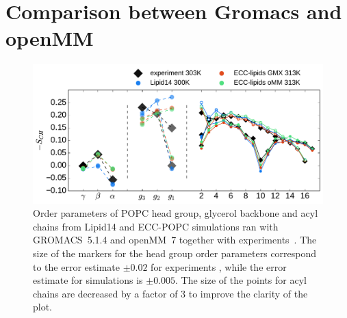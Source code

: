 \documentclass[journal=jpcbfk]{achemso}
\begin{document}
\newpage
\section{Comparison between Gromacs and openMM}

\begin{figure}[!h]
  \centering
  \includegraphics[width=16.0cm]{../Fig/ipython_nb/Order-parameters_exp-L14-ECCL17_q80_sig89_GMX-oMM_compar.pdf}
  \caption{\label{fig:ordPars_actual_GMX_oMM_compar}
    Order parameters of POPC head group, glycerol backbone and acyl chains 
    from Lipid14 \cite{dickson14} and ECC-POPC simulations ran
    with GROMACS~5.1.4 \cite{Abraham15} and openMM~7 \cite{openmm7} 
    together with experiments~\cite{ferreira13}.
    The size of the markers for the head group order parameters correspond to
    the error estimate $\pm 0.02$ for experiments \cite{botan15,ollila16},
    while the error estimate for simulations is $\pm 0.005$.
    The size of the points for acyl chains are decreased by a factor of 3 to improve the clarity of the plot.
  }
\end{figure}
\end{document}
